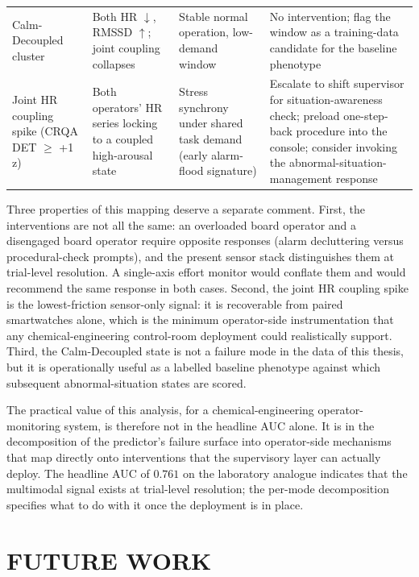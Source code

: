 \begin{table}[!ht]
\begin{tabular}{p{2.8cm}p{3.0cm}p{3.5cm}p{4.6cm}}
Calm-Decoupled cluster & Both HR $\downarrow$, RMSSD $\uparrow$; joint coupling collapses & Stable normal operation, low-demand window & No intervention; flag the window as a training-data candidate for the baseline phenotype \\
Joint HR coupling spike (CRQA DET $\geq$ +1 z) & Both operators' HR series locking to a coupled high-arousal state & Stress synchrony under shared task demand (early alarm-flood signature) & Escalate to shift supervisor for situation-awareness check; preload one-step-back procedure into the console; consider invoking the abnormal-situation-management response \cite{nazir2012role} \\
\bottomrule
\end{tabular}
\end{table}

Three properties of this mapping deserve a separate comment. First, the interventions are not all the same: an overloaded board operator and a disengaged board operator require opposite responses (alarm decluttering versus procedural-check prompts), and the present sensor stack distinguishes them at trial-level resolution. A single-axis effort monitor would conflate them and would recommend the same response in both cases. Second, the joint HR coupling spike is the lowest-friction sensor-only signal: it is recoverable from paired smartwatches alone, which is the minimum operator-side instrumentation that any chemical-engineering control-room deployment could realistically support. Third, the Calm-Decoupled state is not a failure mode in the data of this thesis, but it is operationally useful as a labelled baseline phenotype against which subsequent abnormal-situation states are scored.

The practical value of this analysis, for a chemical-engineering operator-monitoring system, is therefore not in the headline AUC alone. It is in the decomposition of the predictor's failure surface into operator-side mechanisms that map directly onto interventions that the supervisory layer can actually deploy. The headline AUC of $0.761$ on the laboratory analogue indicates that the multimodal signal exists at trial-level resolution; the per-mode decomposition specifies what to do with it once the deployment is in place.


\chapter{FUTURE WORK}\label{sec:future}

